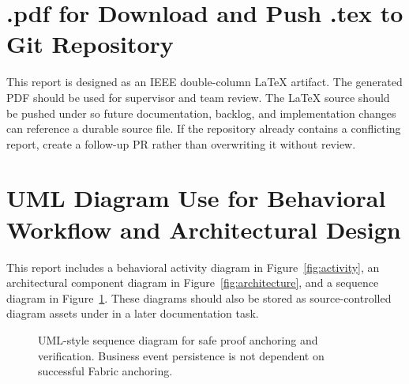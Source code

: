 \documentclass[conference]{IEEEtran}
\begin{document}
\section{.pdf for Download and Push .tex to Git Repository}
This report is designed as an IEEE double-column LaTeX artifact. The generated PDF should be used for supervisor and team review. The LaTeX source should be pushed under  so future documentation, backlog, and implementation changes can reference a durable source file. If the repository already contains a conflicting report, create a follow-up PR rather than overwriting it without review.

\section{UML Diagram Use for Behavioral Workflow and Architectural Design}
This report includes a behavioral activity diagram in Figure~\ref{fig:activity}, an architectural component diagram in Figure~\ref{fig:architecture}, and a sequence diagram in Figure~\ref{fig:sequence}. These diagrams should also be stored as source-controlled diagram assets under  in a later documentation task.

\begin{figure}[t]
\centering
{}
\caption{UML-style sequence diagram for safe proof anchoring and verification. Business event persistence is not dependent on successful Fabric anchoring.}
\label{fig:sequence}
\end{figure}
\end{document}
